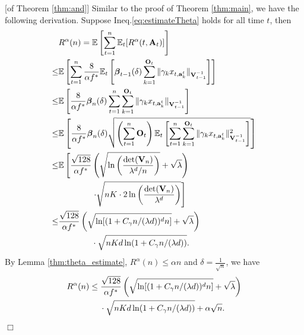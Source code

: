 \documentclass{article}
\newcommand{\bbeta}{\boldsymbol{\beta}}
\newcommand{\EE}{\mathbb{E}}
\newcommand{\bA}{\mathbf{A}}
\newcommand{\ba}{\mathbf{a}}
\newcommand{\bO}{\mathbf{O}}
\newcommand{\bV}{\mathbf{V}}
\newcommand{\norm}[1]{\| #1 \|}
\newenvironment{proof}{\noindent {\textbf{Proof. }}}{$\Box$ \medskip}
\begin{document}
\begin{proof}[of Theorem \ref{thm:and}]
	Similar to the proof of Theorem \ref{thm:main}, we have the following derivation. Suppose Ineq.\eqref{eq:estimateTheta} holds for all time $t$, then
	\begin{align}
	&R^{\alpha}(n) = \EE \left[ \sum_{t=1}^{n} \EE_{t}[R^{\alpha}(t, \bA_t)] \right] \notag\\
	\leq& \EE \left[\sum_{t=1}^{n} \frac{8}{\alpha f^{\ast}} \EE_t\left[\bbeta_{t-1}(\delta)\sum_{k=1}^{\bO_t}\norm{\gamma_k x_{t,\ba_k^t}}_{\bV_{t-1}^{-1}} \right] \right] \label{eq:pfMCdeltaEst}\\
	\leq& \EE\left[\frac{8}{\alpha f^{\ast}} \bbeta_{n}(\delta) \sum_{t=1}^{n} \sum_{k=1}^{\bO_t}\norm{\gamma_k x_{t,\ba_k^t}}_{\bV_{t-1}^{-1}} \right] \label{eq:pfMCbeta}\\
	\leq& \EE\left[\frac{8}{\alpha f^{\ast}} \bbeta_{n}(\delta) \sqrt{ \left(\sum_{t=1}^{n} \bO_t \right) \EE_t \left[\sum_{t=1}^{n} \sum_{k=1}^{\bO_t}\norm{\gamma_k x_{t,\ba_k^t}}_{\bV_{t-1}^{-1}}^2 \right]} \right] \label{eq:pfMCmeaneq}\\
	\leq& \EE \left[\frac{\sqrt{128}}{\alpha f^{\ast}} \left(\sqrt{\ln\left(\frac{\det(\bV_n)}{\lambda^d /n}\right) } + \sqrt{\lambda} \right) \right. \notag\\
	&\qquad \qquad \left. \cdot \sqrt{nK \cdot 2\ln \left(\frac{\det(\bV_n)}{\lambda^d} \right)} \right] \label{eq:pfMCsumXi}\\
	\leq& \frac{\sqrt{128}}{\alpha f^{\ast}} \left(\sqrt{ \ln [ (1 + C_\gamma n/(\lambda d))^d n]} + \sqrt{\lambda} \right) \notag\\
	&\qquad \qquad \cdot \sqrt{nKd\ln(1 + C_\gamma n/(\lambda d))}. \label{eq:pfMCdetEst}
	\end{align}
	By Lemma \ref{thm:theta_estimate}, $R^{\alpha}(n) \leq \alpha n$ and $\delta = \frac{1}{\sqrt{n}}$, we have
	\begin{align*}
		&R^{\alpha}(n) \leq \frac{\sqrt{128}}{\alpha f^{\ast}} \left(\sqrt{ \ln [ (1 + C_\gamma n/(\lambda d))^d n]} + \sqrt{\lambda} \right) \notag\\
		&\qquad \qquad \cdot \sqrt{nKd\ln(1 + C_\gamma n/(\lambda d))} + \alpha \sqrt{n}.
	\end{align*}
\end{proof}
	
\end{document}
